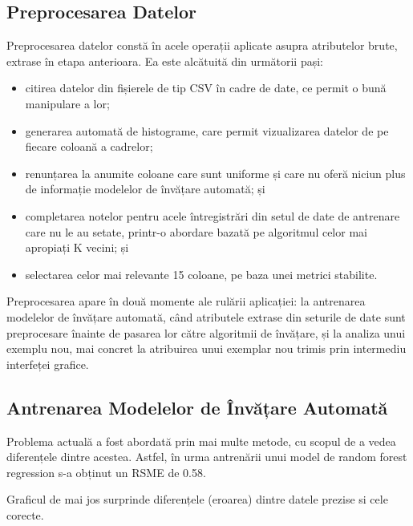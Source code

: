 \documentclass{article}
\begin{document}
\subsection{Preprocesarea Datelor}

Preprocesarea datelor constă în acele operații aplicate asupra atributelor brute, extrase în etapa anterioara. Ea este alcătuită din următorii pași:
\begin{itemize}
    \item citirea datelor din fișierele de tip CSV în cadre de date, ce permit o bună manipulare a lor;
    \item generarea automată de histograme, care permit vizualizarea datelor de pe fiecare coloană a cadrelor;
    \item renunțarea la anumite coloane care sunt uniforme și care nu oferă niciun plus de informație modelelor de învățare automată; și
    \item completarea notelor pentru acele întregistrări din setul de date de antrenare care nu le au setate, printr-o abordare bazată pe algoritmul celor mai apropiați K vecini; și
    \item selectarea celor mai relevante 15 coloane, pe baza unei metrici stabilite.
\end{itemize}

Preprocesarea apare în două momente ale rulării aplicației: la antrenarea modelelor de învățare automată, când atributele extrase din seturile de date sunt preprocesare înainte de pasarea lor către algoritmii de învățare, și la analiza unui exemplu nou, mai concret la atribuirea unui exemplar nou trimis prin intermediu interfeței grafice.

\subsection{Antrenarea Modelelor de Învățare Automată}

Problema actuală a fost abordată prin mai multe metode, cu scopul de a vedea diferențele dintre acestea. Astfel, în urma antrenării unui model de random forest regression s-a obținut un RSME de 0.58.

Graficul de mai jos surprinde diferențele (eroarea) dintre datele prezise si cele corecte.
\end{document}
